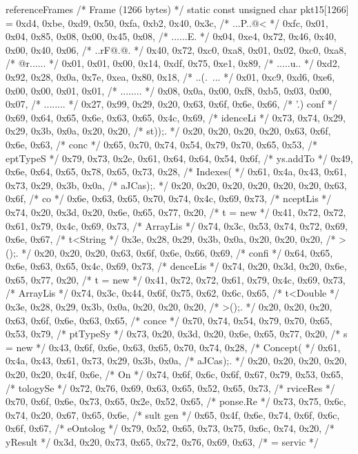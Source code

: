 \begin{chunk}{referenceFrames}
{{{{/* Frame (1266 bytes) */
static const unsigned char pkt15[1266] = {
0xd4, 0xbe, 0xd9, 0x50, 0xfa, 0xb2, 0x40, 0x3c, /* ...P..@< */
0xfc, 0x01, 0x04, 0x85, 0x08, 0x00, 0x45, 0x08, /* ......E. */
0x04, 0xe4, 0x72, 0x46, 0x40, 0x00, 0x40, 0x06, /* ..rF@.@. */
0x40, 0x72, 0xc0, 0xa8, 0x01, 0x02, 0xc0, 0xa8, /* @r...... */
0x01, 0x01, 0x00, 0x14, 0xdf, 0x75, 0xe1, 0x89, /* .....u.. */
0xd2, 0x92, 0x28, 0x0a, 0x7e, 0xea, 0x80, 0x18, /* ..(.~... */
0x01, 0xc9, 0xd6, 0xe6, 0x00, 0x00, 0x01, 0x01, /* ........ */
0x08, 0x0a, 0x00, 0xf8, 0xb5, 0x03, 0x00, 0x07, /* ........ */
0x27, 0x99, 0x29, 0x20, 0x63, 0x6f, 0x6e, 0x66, /* '.) conf */
0x69, 0x64, 0x65, 0x6e, 0x63, 0x65, 0x4c, 0x69, /* idenceLi */
0x73, 0x74, 0x29, 0x29, 0x3b, 0x0a, 0x20, 0x20, /* st));.   */
0x20, 0x20, 0x20, 0x20, 0x63, 0x6f, 0x6e, 0x63, /*     conc */
0x65, 0x70, 0x74, 0x54, 0x79, 0x70, 0x65, 0x53, /* eptTypeS */
0x79, 0x73, 0x2e, 0x61, 0x64, 0x64, 0x54, 0x6f, /* ys.addTo */
0x49, 0x6e, 0x64, 0x65, 0x78, 0x65, 0x73, 0x28, /* Indexes( */
0x61, 0x4a, 0x43, 0x61, 0x73, 0x29, 0x3b, 0x0a, /* aJCas);. */
0x20, 0x20, 0x20, 0x20, 0x20, 0x20, 0x63, 0x6f, /*       co */
0x6e, 0x63, 0x65, 0x70, 0x74, 0x4c, 0x69, 0x73, /* nceptLis */
0x74, 0x20, 0x3d, 0x20, 0x6e, 0x65, 0x77, 0x20, /* t = new  */
0x41, 0x72, 0x72, 0x61, 0x79, 0x4c, 0x69, 0x73, /* ArrayLis */
0x74, 0x3c, 0x53, 0x74, 0x72, 0x69, 0x6e, 0x67, /* t<String */
0x3e, 0x28, 0x29, 0x3b, 0x0a, 0x20, 0x20, 0x20, /* >();.    */
0x20, 0x20, 0x20, 0x63, 0x6f, 0x6e, 0x66, 0x69, /*    confi */
0x64, 0x65, 0x6e, 0x63, 0x65, 0x4c, 0x69, 0x73, /* denceLis */
0x74, 0x20, 0x3d, 0x20, 0x6e, 0x65, 0x77, 0x20, /* t = new  */
0x41, 0x72, 0x72, 0x61, 0x79, 0x4c, 0x69, 0x73, /* ArrayLis */
0x74, 0x3c, 0x44, 0x6f, 0x75, 0x62, 0x6c, 0x65, /* t<Double */
0x3e, 0x28, 0x29, 0x3b, 0x0a, 0x20, 0x20, 0x20, /* >();.    */
0x20, 0x20, 0x20, 0x63, 0x6f, 0x6e, 0x63, 0x65, /*    conce */
0x70, 0x74, 0x54, 0x79, 0x70, 0x65, 0x53, 0x79, /* ptTypeSy */
0x73, 0x20, 0x3d, 0x20, 0x6e, 0x65, 0x77, 0x20, /* s = new  */
0x43, 0x6f, 0x6e, 0x63, 0x65, 0x70, 0x74, 0x28, /* Concept( */
0x61, 0x4a, 0x43, 0x61, 0x73, 0x29, 0x3b, 0x0a, /* aJCas);. */
0x20, 0x20, 0x20, 0x20, 0x20, 0x20, 0x4f, 0x6e, /*       On */
0x74, 0x6f, 0x6c, 0x6f, 0x67, 0x79, 0x53, 0x65, /* tologySe */
0x72, 0x76, 0x69, 0x63, 0x65, 0x52, 0x65, 0x73, /* rviceRes */
0x70, 0x6f, 0x6e, 0x73, 0x65, 0x2e, 0x52, 0x65, /* ponse.Re */
0x73, 0x75, 0x6c, 0x74, 0x20, 0x67, 0x65, 0x6e, /* sult gen */
0x65, 0x4f, 0x6e, 0x74, 0x6f, 0x6c, 0x6f, 0x67, /* eOntolog */
0x79, 0x52, 0x65, 0x73, 0x75, 0x6c, 0x74, 0x20, /* yResult  */
0x3d, 0x20, 0x73, 0x65, 0x72, 0x76, 0x69, 0x63, /* = servic */
}}}}}
\end{chunk}
